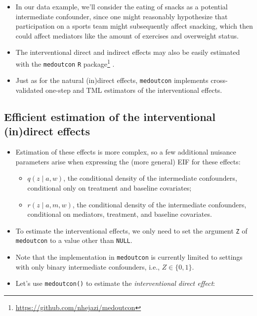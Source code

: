 \documentclass[
  12pt,
]{book}
\newcommand{\passthrough}[1]{#1}
\providecommand{\tightlist}{%
  \setlength{\itemsep}{0pt}\setlength{\parskip}{0pt}}
\renewcommand{\href}[2]{#2\footnote{\url{#1}}}
\theoremstyle{definition}
\theoremstyle{definition}
\theoremstyle{definition}
\newcommand{\1}{\mathbbm{1}}
\begin{document}
\begin{itemize}
\tightlist
\item
  In our data example, we'll consider the eating of snacks as a potential
  intermediate confounder, since one might reasonably hypothesize that
  participation on a sports team might subsequently affect snacking, which then
  could affect mediators like the amount of exercises and overweight status.
\item
  The interventional direct and indirect effects may also be easily estimated
  with the \href{https://github.com/nhejazi/medoutcon}{\passthrough{\lstinline!medoutcon!} \passthrough{\lstinline!R!} package}
  \citep{hejazi2021medoutcon}.
\item
  Just as for the natural (in)direct effects, \passthrough{\lstinline!medoutcon!} implements
  cross-validated one-step and TML estimators of the interventional effects.
\end{itemize}

\hypertarget{efficient-estimation-of-the-interventional-indirect-effects}{%
\subsection{Efficient estimation of the interventional (in)direct effects}\label{efficient-estimation-of-the-interventional-indirect-effects}}

\begin{itemize}
\tightlist
\item
  Estimation of these effects is more complex, so a few additional nuisance
  parameters arise when expressing the (more general) EIF for these effects:

  \begin{itemize}
  \tightlist
  \item
    \(q(z \mid a, w)\), the conditional density of the intermediate confounders,
    conditional only on treatment and baseline covariates;
  \item
    \(r(z \mid a, m, w)\), the conditional density of the intermediate
    confounders, conditional on mediators, treatment, and baseline covariates.
  \end{itemize}
\item
  To estimate the interventional effects, we only need to set the argument \passthrough{\lstinline!Z!}
  of \passthrough{\lstinline!medoutcon!} to a value other than \passthrough{\lstinline!NULL!}.
\item
  Note that the implementation in \passthrough{\lstinline!medoutcon!} is currently limited to settings
  with only binary intermediate confounders, i.e., \(Z \in \{0, 1\}\).
\item
  Let's use \passthrough{\lstinline!medoutcon()!} to estimate the \emph{interventional direct effect}:
\end{itemize}
\end{document}
